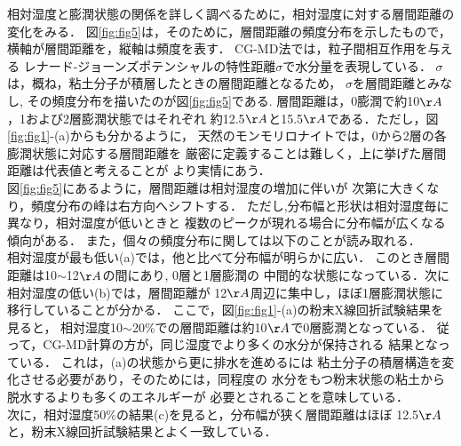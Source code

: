 \hspace{\parindent}
相対湿度と膨潤状態の関係を詳しく調べるために，相対湿度に対する層間距離の変化をみる．
図\ref{fig:fig5}は，そのために，層間距離の頻度分布を示したもので，
横軸が層間距離を，縦軸は頻度を表す． CG-MD法では，粒子間相互作用を与える
レナード-ジョーンズポテンシャルの特性距離$\sigma$で水分量を表現している．
$\sigma$は，概ね，粘土分子が積層したときの層間距離となるため，
$\sigma$を層間距離とみなし, その頻度分布を描いたのが図\ref{fig:fig5}である.
層間距離は，0膨潤で約10$\AA$，1および2層膨潤状態ではそれぞれ
約12.5$\AA$と15.5$\AA$である．ただし，図\ref{fig:fig1}-(a)からも分かるように，
天然のモンモリロナイトでは，0から2層の各膨潤状態に対応する層間距離を
厳密に定義することは難しく，上に挙げた層間距離は代表値と考えることが
より実情にあう．\\
\hspace{\parindent}
図\ref{fig:fig5}にあるように，層間距離は相対湿度の増加に伴いが
次第に大きくなり，頻度分布の峰は右方向へシフトする．
ただし,分布幅と形状は相対湿度毎に異なり，相対湿度が低いときと
複数のピークが現れる場合に分布幅が広くなる傾向がある．
また，個々の頻度分布に関しては以下のことが読み取れる．\\
\hspace{\parindent}
相対湿度が最も低い(a)では，他と比べて分布幅が明らかに広い．
このとき層間距離は10$\sim$12$\AA$の間にあり, 0層と1層膨潤の
中間的な状態になっている．次に相対湿度の低い(b)では，層間距離が
12$\AA$周辺に集中し，ほぼ1層膨潤状態に移行していることが分かる．
ここで，図\ref{fig:fig1}-(a)の粉末X線回折試験結果を見ると，
相対湿度10$\sim$20$\%$での層間距離は約10$\AA$で0層膨潤となっている．
従って，CG-MD計算の方が，同じ湿度でより多くの水分が保持される
結果となっている． これは，(a)の状態から更に排水を進めるには
粘土分子の積層構造を変化させる必要があり，そのためには，同程度の
水分をもつ粉末状態の粘土から脱水するよりも多くのエネルギーが
必要とされることを意味している．\\
\hspace{\parindent}
次に，相対湿度50$\%$の結果(c)を見ると，分布幅が狭く層間距離はほぼ
12.5$\AA$と，粉末X線回折試験結果とよく一致している．

